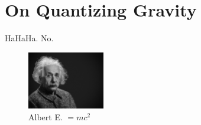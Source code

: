 \section{On Quantizing Gravity}

HaHaHa. No.

\begin{figure}
	\centering
	\includegraphics[width=0.3\textwidth]{media/einstein.jpg}
	\caption{Albert E. $=mc^2$}%
	\label{fig:einstein}
\end{figure}
